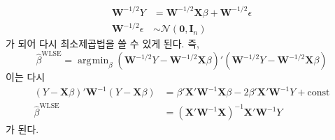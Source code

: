 \documentclass[answers]{exam}
\DeclareMathOperator*{\argmin}{\arg\!\min}
\newcommand{\bs}{\boldsymbol}
\begin{document}
\begin{questions}
\begin{solution}
\begin{enumerate}[(a)]
        \begin{align}
          \mathbf{W}^{-1/2}Y &= \mathbf{W}^{-1/2}\mathbf{X}\beta+\mathbf{W}^{-1/2}\epsilon\\
          \mathbf{W}^{-1/2}\epsilon &\sim \mathcal{N}\left(\bs{0},\mathbf{I}_{n}\right)
        \end{align}
        가 되어 다시 최소제곱법을 쓸 수 있게 된다. 즉,
        \begin{equation}
          \widehat{\beta}^{\text{WLSE}} = \argmin_{\beta}\left(\mathbf{W}^{-1/2}Y-\mathbf{W}^{-1/2}\mathbf{X}\beta\right)'\left(\mathbf{W}^{-1/2}Y-\mathbf{W}^{-1/2}\mathbf{X}\beta\right)
        \end{equation}
        이는 다시
        \begin{align}
          \left(Y-\mathbf{X}\beta\right)'\mathbf{W}^{-1}\left(Y-\mathbf{X}\beta\right) &= \beta'\mathbf{X}'\mathbf{W}^{-1}\mathbf{X}\beta-2\beta'\mathbf{X}'\mathbf{W}^{-1}Y+\text{const}\\
          \widehat{\beta}^{\text{WLSE}} &= \left(\mathbf{X}'\mathbf{W}^{-1}\mathbf{X}\right)^{-1}\mathbf{X}'\mathbf{W}^{-1}Y
        \end{align}
        가 된다.
      \end{enumerate}
     \end{solution}
\end{questions}
\end{document}
